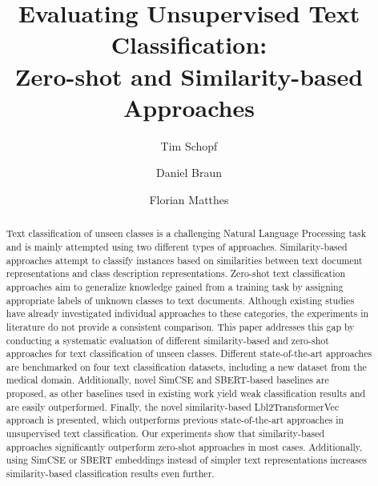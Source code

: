 \documentclass[sigconf]{acmart}
\begin{document}
\title[Evaluating Unsupervised Text Classification: Zero-shot and Similarity-based Approaches]{Evaluating Unsupervised Text Classification: \\ Zero-shot and Similarity-based Approaches}

\author{Tim Schopf}

\author{Daniel Braun}

\author{Florian Matthes}



\renewcommand{\shortauthors}{Schopf et al.}

\begin{abstract}
    Text classification of unseen classes is a challenging Natural Language Processing task and is mainly attempted using two different types of approaches. Similarity-based approaches attempt to classify instances based on similarities between text document representations and class description representations. Zero-shot text classification approaches aim to generalize knowledge gained from a training task by assigning appropriate labels of unknown classes to text documents. Although existing studies have already investigated individual approaches to these categories, the experiments in literature do not provide a consistent comparison. This paper addresses this gap by conducting a systematic evaluation of different similarity-based and zero-shot approaches for text classification of unseen classes. Different state-of-the-art approaches are benchmarked on four text classification datasets, including a new dataset from the medical domain. Additionally, novel \mbox{SimCSE} \cite{gao-etal-2021-simcse} and SBERT-based \cite{reimers-gurevych-2019-sentence} baselines are proposed, as other baselines used in existing work yield weak classification results and are easily outperformed. Finally, the novel similarity-based Lbl2TransformerVec approach is presented, which outperforms previous state-of-the-art approaches in unsupervised text classification. Our experiments show that similarity-based approaches significantly outperform zero-shot approaches in most cases. Additionally, using SimCSE or SBERT embeddings instead of simpler text representations increases similarity-based classification results even further.
\end{abstract}
\end{document}
